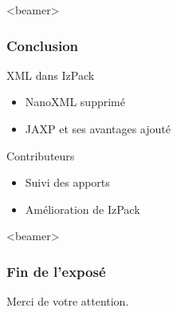 \begin{frame}<beamer>
\frametitle{Conclusion}
\begin{beamerboxesrounded}[shadow=true]{XML dans IzPack}
\begin{itemize}
	\item NanoXML supprimé
	\item JAXP et ses avantages ajouté
\end{itemize}
\end{beamerboxesrounded}
\vfill
\begin{beamerboxesrounded}[shadow=true]{Contributeurs}
\begin{itemize}
	\item Suivi des apports
	\item Amélioration de IzPack
\end{itemize}
\end{beamerboxesrounded}
\end{frame}
\begin{frame}<beamer>\frametitle{Fin de l'exposé}
\begin{center}
Merci de votre attention.
\end{center}
\end{frame}